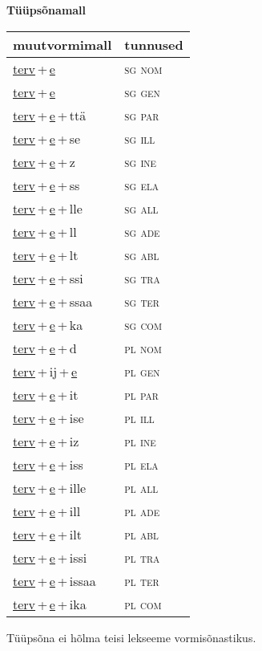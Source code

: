 
\vspace{1.8em}
\begin{minipage}{\textwidth}
\textbf{Tüüpsõnamall \,}\\

\begin{sideways}
\begin{tabular}{l l}
muutvormimall & tunnused \\
\hline
\underline{terv}\,+\,\underline{e} & \textsc{ sg nom } \\
\underline{terv}\,+\,\underline{e} & \textsc{ sg gen } \\
\underline{terv}\,+\,\underline{e}\,+\,ttä & \textsc{ sg par } \\
\underline{terv}\,+\,\underline{e}\,+\,se & \textsc{ sg ill } \\
\underline{terv}\,+\,\underline{e}\,+\,z & \textsc{ sg ine } \\
\underline{terv}\,+\,\underline{e}\,+\,ss & \textsc{ sg ela } \\
\underline{terv}\,+\,\underline{e}\,+\,lle & \textsc{ sg all } \\
\underline{terv}\,+\,\underline{e}\,+\,ll & \textsc{ sg ade } \\
\underline{terv}\,+\,\underline{e}\,+\,lt & \textsc{ sg abl } \\
\underline{terv}\,+\,\underline{e}\,+\,ssi & \textsc{ sg tra } \\
\underline{terv}\,+\,\underline{e}\,+\,ssaa & \textsc{ sg ter } \\
\underline{terv}\,+\,\underline{e}\,+\,ka & \textsc{ sg com } \\
\underline{terv}\,+\,\underline{e}\,+\,d & \textsc{ pl nom } \\
\underline{terv}\,+\,ij\,+\,\underline{e} & \textsc{ pl gen } \\
\underline{terv}\,+\,\underline{e}\,+\,it & \textsc{ pl par } \\
\underline{terv}\,+\,\underline{e}\,+\,ise & \textsc{ pl ill } \\
\underline{terv}\,+\,\underline{e}\,+\,iz & \textsc{ pl ine } \\
\underline{terv}\,+\,\underline{e}\,+\,iss & \textsc{ pl ela } \\
\underline{terv}\,+\,\underline{e}\,+\,ille & \textsc{ pl all } \\
\underline{terv}\,+\,\underline{e}\,+\,ill & \textsc{ pl ade } \\
\underline{terv}\,+\,\underline{e}\,+\,ilt & \textsc{ pl abl } \\
\underline{terv}\,+\,\underline{e}\,+\,issi & \textsc{ pl tra } \\
\underline{terv}\,+\,\underline{e}\,+\,issaa & \textsc{ pl ter } \\
\underline{terv}\,+\,\underline{e}\,+\,ika & \textsc{ pl com } \\
\end{tabular}
\end{sideways}
\label{tab:tüüpsõnamall-terve}

\end{minipage}

 
\vspace{1em}
\noindent Tüüpsõna ei hõlma teisi lekseeme vormi\-sõnastikus.
